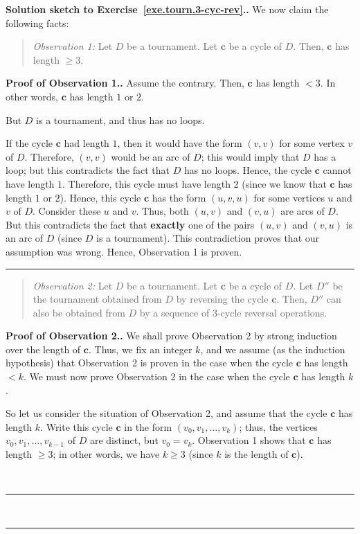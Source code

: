 \documentclass[numbers=enddot,12pt,final,onecolumn,notitlepage]{scrartcl}%
\theoremstyle{definition}
\newenvironment{statement}{\begin{quote}}{\end{quote}}
\newenvironment{proof}[1][Proof]{\noindent\textbf{#1.} }{\ \rule{0.5em}{0.5em}}
\newcommand{\tup}[1]{\left( #1 \right)}
\begin{document}
\begin{proof}[Solution sketch to Exercise~\ref{exe.tourn.3-cyc-rev}.]
We now claim the following facts:

\begin{statement}
\textit{Observation 1:} Let $D$ be a tournament. Let $\mathbf{c}$ be a
cycle of $D$. Then, $\mathbf{c}$ has length $\geq 3$.
\end{statement}
\begin{proof}[Proof of Observation 1.]
Assume the contrary. Then, $\mathbf{c}$ has length $< 3$. In other
words, $\mathbf{c}$ has length $1$ or $2$.

But $D$ is a tournament, and thus has no loops.

If the cycle $\mathbf{c}$ had length $1$, then it would have the
form $\tup{v, v}$ for some vertex $v$ of $D$. Therefore, $\tup{v, v}$
would be an arc of $D$; this would imply that $D$ has a loop; but this
contradicts the fact that $D$ has no loops. Hence, the cycle
$\mathbf{c}$ cannot have length $1$. Therefore, this cycle must have
length $2$ (since we know that $\mathbf{c}$ has length $1$ or $2$).
Hence, this cycle $\mathbf{c}$ has the form $\tup{u, v, u}$ for some
vertices $u$ and $v$ of $D$. Consider these $u$ and $v$. Thus, both
$\tup{u, v}$ and $\tup{v, u}$ are arcs of $D$. But this contradicts
the fact that \textbf{exactly} one of the pairs
$\tup{u, v}$ and $\tup{v, u}$ is an arc of $D$ (since $D$ is a
tournament). This contradiction proves that our assumption was wrong.
Hence, Observation 1 is proven.
\end{proof}

\begin{statement}
\textit{Observation 2:} Let $D$ be a tournament. Let $\mathbf{c}$ be a
cycle of $D$. Let $D''$ be the tournament obtained from $D$ by
reversing the cycle $\mathbf{c}$. Then, $D''$ can also be obtained
from $D$ by a sequence of $3$-cycle reversal operations.
\end{statement}

\begin{proof}[Proof of Observation 2.]
We shall prove Observation 2 by strong induction over the length of
$\mathbf{c}$. Thus, we fix an integer $k$, and we assume (as the
induction hypothesis) that Observation 2 is proven in the case when
the cycle $\mathbf{c}$ has length $< k$. We must now prove
Observation 2 in the case when the cycle $\mathbf{c}$ has length $k$.

So let us consider the situation of Observation 2, and assume that
the cycle $\mathbf{c}$ has length $k$. Write this cycle $\mathbf{c}$
in the form $\tup{v_0, v_1, \ldots, v_k}$; thus, the vertices
$v_0, v_1, \ldots, v_{k-1}$ of $D$ are distinct, but $v_0 = v_k$.
Observation 1 shows that $\mathbf{c}$ has length $\geq 3$; in other
words, we have $k \geq 3$ (since $k$ is the length of $\mathbf{c}$).


\end{proof}
\end{proof}
\end{document}
